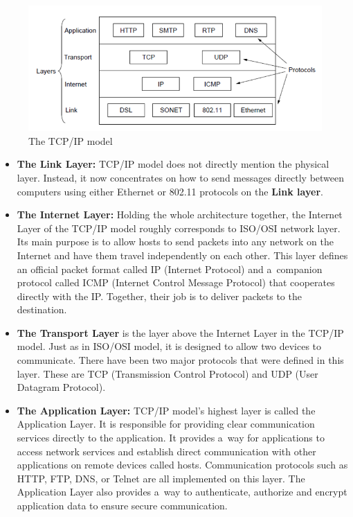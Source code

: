 \documentclass[
  printed,     %
  color,       %
  oneside,     %
  nosansbold,  %
  nocolorbold, %
  nolof,         %
  nolot,         %
]{fithesis4}
\begin{document}
\begin{figure}[h]
  \begin{center}
    \includegraphics[width=1\textwidth]{images/tcpip_new.png}
  \end{center}
  \caption{The TCP/IP model~\cite{10.5555/2584507}}
  \label{fig:tcpipmodel}
\end{figure}

\newpage

\begin{itemize}
    \item \textbf{The Link Layer:} TCP/IP model does not directly mention the physical layer. Instead, it now concentrates on how to send messages directly between computers using either Ethernet or 802.11 protocols on the \textbf{Link layer}.

    \item \textbf{The Internet Layer:} Holding the whole architecture together, the Internet Layer of the TCP/IP model roughly corresponds to ISO/OSI network layer. Its main purpose is to allow hosts to send packets into any network on the Internet and have them travel independently on each other. This layer defines an official packet format called IP (Internet Protocol) and a~companion protocol called ICMP (Internet Control Message Protocol) that cooperates directly with the IP. Together, their job is to deliver packets to the destination.

    \item \textbf{The Transport Layer} is the layer above the Internet Layer in the TCP/IP model. Just as in ISO/OSI model, it is designed to allow two devices to communicate. There have been two major protocols that were defined in this layer. These are TCP (Transmission Control Protocol) and UDP (User Datagram Protocol).

    \item \textbf{The Application Layer:} TCP/IP model's highest layer is called the Application Layer. It is responsible for providing clear communication services directly to the application. It provides a~way for applications to access network services and establish direct communication with other applications on remote devices called hosts. Communication protocols such as HTTP, FTP, DNS, or Telnet are all implemented on this layer. The Application Layer also provides a~way to authenticate, authorize and encrypt application data to ensure secure communication.
\end{itemize}
\end{document}
